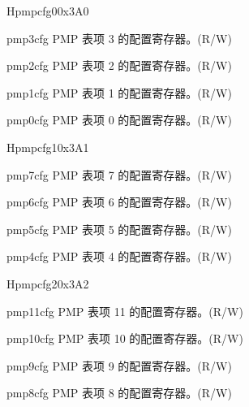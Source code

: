 \begin{register}{H}{pmpcfg0}{0x3A0}
\label{regdesc:lppmpcfg0}%
%
%
%
%
\regnewline%
\begin{regdesc}
\begin{reglist}
\label{fielddesc:lppmp3cfg}\item [pmp3cfg] PMP 表项 3 的配置寄存器。(R/W)
\label{fielddesc:lppmp2cfg}\item [pmp2cfg] PMP 表项 2 的配置寄存器。(R/W)
\label{fielddesc:lppmp1cfg}\item [pmp1cfg] PMP 表项 1 的配置寄存器。(R/W)
\label{fielddesc:lppmp0cfg}\item [pmp0cfg] PMP 表项 0 的配置寄存器。(R/W)
\end{reglist}
\end{regdesc}
\end{register}

\begin{register}{H}{pmpcfg1}{0x3A1}
\label{regdesc:lppmpcfg1}%
%
%
%
%
\regnewline%
\begin{regdesc}
\begin{reglist}
\label{fielddesc:lppmp7cfg}\item [pmp7cfg] PMP 表项 7 的配置寄存器。(R/W)
\label{fielddesc:lppmp6cfg}\item [pmp6cfg] PMP 表项 6 的配置寄存器。(R/W)
\label{fielddesc:lppmp5cfg}\item [pmp5cfg] PMP 表项 5 的配置寄存器。(R/W)
\label{fielddesc:lppmp4cfg}\item [pmp4cfg] PMP 表项 4 的配置寄存器。(R/W)
\end{reglist}
\end{regdesc}
\end{register}

\begin{register}{H}{pmpcfg2}{0x3A2}
\label{regdesc:lppmpcfg2}%
%
%
%
%
\regnewline%
\begin{regdesc}
\begin{reglist}
\label{fielddesc:lppmp11cfg}\item [pmp11cfg] PMP 表项 11 的配置寄存器。(R/W)
\label{fielddesc:lppmp10cfg}\item [pmp10cfg] PMP 表项 10 的配置寄存器。(R/W)
\label{fielddesc:lppmp9cfg}\item [pmp9cfg] PMP 表项 9 的配置寄存器。(R/W)
\label{fielddesc:lppmp8cfg}\item [pmp8cfg] PMP 表项 8 的配置寄存器。(R/W)
\end{reglist}
\end{regdesc}
\end{register}

